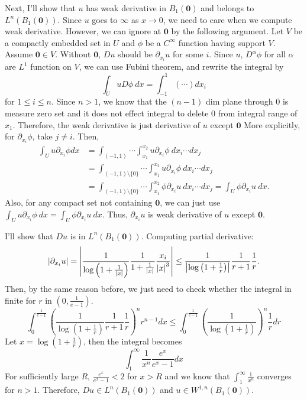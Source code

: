 \documentclass{article}
\begin{document}
Next, I'll show that $u$ has weak derivative in $B_1(\bm{0})$ and belongs to $L^n(B_1(\bm{0}))$. Since $u$ goes to $\infty $ as $x\rightarrow 0$, we need to care when we compute weak derivative. However, we can ignore at $\bm{0}$ by the following argument. Let $V$ be a compactly embedded set in $U$ and $\phi$ be a $C^\infty$ function having support $V$. Assume $\bm{0}\in V$. Without $\bm{0}$, $D u$ should be $\partial_{x_i}u$ for some $i$. Since $u$, $D^\alpha \phi$ for all $\alpha$ are $L^1$ function on $V$, we can use Fubini theorem, and rewrite the integral by
\begin{equation*}
\int_U uD \phi ~dx=\int_{-1}^1 (\cdots) dx_i
\end{equation*}
for $1\leq i \leq n$. Since $n>1$, we know that the $(n-1)$ dim plane through $0$ is measure zero set and it does not effect integral to delete $0$ from integral range of $x_1$. Therefore, the weak derivative is just derivative of $u$ except $\bm{0}$ More explicitly, for $\partial_{x_i}\phi$, take $j\neq i$. Then,
\begin{equation*}
\begin{split}
\int_U u\partial_{x_i}\phi dx&=\int_{(-1, 1)}\cdots \int_{x_1}^{x_2} u\partial_{x_i}\phi~ dx_i \cdots dx_j \\
&= \int_{(-1, 1)\setminus\{0\}}\cdots \int_{x_1}^{x_2} u\partial_{x_i}\phi ~dx_i \cdots dx_j\\
&= \int_{(-1, 1)\setminus\{0\}}\cdots \int_{x_1}^{x_2} \phi\partial_{x_i} u~ dx_i \cdots dx_j=\int_U \phi\partial_{x_i} u~dx.
\end{split}
\end{equation*}
Also, for any compact set not containing $\bm{0}$, we can just use $\int_U u\partial_{x_i}\phi~dx=\int_U \phi\partial_{x_i}u~dx$. Thus, $\partial_{x_i}u$ is weak derivative of $u$ except $\bm{0}$.

I'll show that $Du$ is in $L^n(B_1(\bm{0}))$. Computing partial derivative:
\begin{equation*}
\abs{\partial_{x_i} u}=\abs{\frac{1}{\log\left(1+\frac{1}{\abs{x}}\right)}\frac{1}{1+\frac{1}{\abs{x}}}\frac{x_i}{\abs{x}^3}}\leq  \frac{1}{\abs{\log\left(1+\frac{1}{r}\right)}}\frac{1}{r+1}\frac{1}{r}.
\end{equation*}
Then, by the same reason before, we just need to check whether the integral in finite for $r$ in $\left(0, \frac{1}{e-1}\right)$.
\begin{equation*}
\int_0^{\frac{1}{e-1}} \left(\frac{1}{\log\left(1+\frac{1}{r}\right)}\frac{1}{r+1}\frac{1}{r}\right)^n r^{n-1}dx \leq \int_0^{\frac{1}{e-1}} \left(\frac{1}{\log\left(1+\frac{1}{r}\right)}\right)^n \frac{1}{r}dr
\end{equation*}
Let $x=\log\left(1+\frac{1}{r}\right)$, then the integral becomes
\begin{equation*}
\int_1^\infty \frac{1}{x^n}\frac{e^x}{e^x-1}dx
\end{equation*}
For sufficiently large $R$, $\frac{e^x}{e^x-1}<2$ for $x>R$ and we know that $\int_1^\infty \frac{1}{x^n}$ converges for $n>1$. Therefore, $Du\in L^n(B_1(\bm{0}))$ and $u\in W^{1,n}(B_1(\bm{0}))$.
\end{document}
